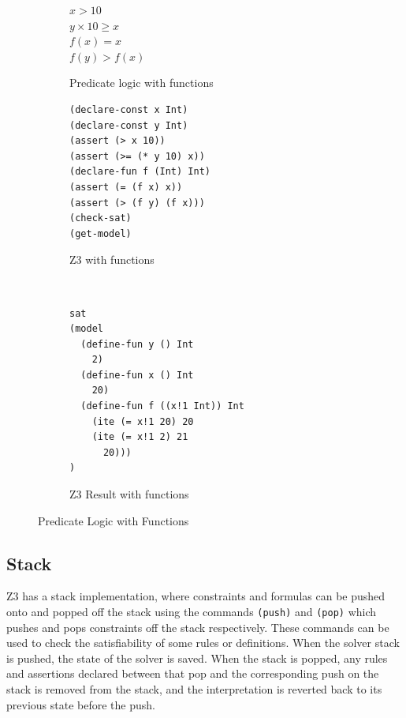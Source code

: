 \documentclass[a4paper]{report}
\begin{document}
\begin{figure}[!htb]
\centering
\begin{subfigure}[b]{\textwidth}
\centering
$x > 10$ \\
$y \times 10 \geq x$ \\
$f(x) = x$ \\
$f(y) > f(x)$
\caption{Predicate logic with functions}
\label{fig:Predicate logic with functions}
\end{subfigure}
\begin{subfigure}[b]{\textwidth}
\lstset{numbers=left, showspaces=false,
    showstringspaces=false, tabsize=2, breaklines=true,
    xleftmargin=5.0ex,
}
\lstset{basicstyle=\ttfamily}
\centering
\begin{lstlisting}[frame=single]
(declare-const x Int)
(declare-const y Int)
(assert (> x 10))
(assert (>= (* y 10) x))
(declare-fun f (Int) Int)
(assert (= (f x) x))
(assert (> (f y) (f x)))
(check-sat)
(get-model)
\end{lstlisting}
\caption{Z3 with functions}
\label{fig:Z3 with functions}
\end{subfigure}\\
\begin{subfigure}[b]{\textwidth}
\lstset{basicstyle=\ttfamily}
\begin{lstlisting}[frame=single]
sat
(model 
  (define-fun y () Int
    2)
  (define-fun x () Int
    20)
  (define-fun f ((x!1 Int)) Int
    (ite (= x!1 20) 20
    (ite (= x!1 2) 21
      20)))
)
\end{lstlisting}
\caption{Z3 Result with functions}
\label{fig:Z3 Function Result}
\end{subfigure}
\caption{Predicate Logic with Functions}
\label{fig:Predicate Logic with Functions}
\end{figure} 

\subsection{Stack}
Z3 has a stack implementation, where constraints and formulas can be pushed onto and popped off the stack using the commands \texttt{(push)} and \texttt{(pop)} which pushes and pops constraints off the stack respectively. These commands can be used to check the satisfiability of some rules or definitions. When the solver stack is pushed, the state of the solver is saved. When the stack is popped, any rules and assertions declared between that pop and the corresponding push on the stack is removed from the stack, and the interpretation is reverted back to its previous state before the push.\\
\end{document}
